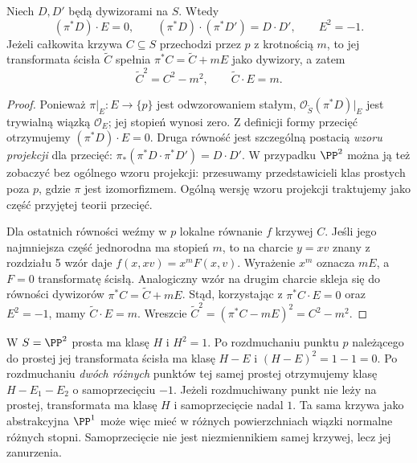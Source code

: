 \begin{stwierdzenie}
\label{st:ga6-blowup-form}
Niech $D,D'$ będą dywizorami na $S$. Wtedy
\[
 (\pi^*D)\cdot E=0,\qquad
 (\pi^*D)\cdot(\pi^*D')=D\cdot D',\qquad E^2=-1.
\]
Jeżeli całkowita krzywa $C\subseteq S$ przechodzi
przez $p$ z krotnością $m$, to jej transformata ścisła
$\widetilde C$ spełnia
$\pi^*C=\widetilde C+mE$ jako dywizory, a zatem
\[
 \widetilde C^2=C^2-m^2,\qquad
 \widetilde C\cdot E=m.
\]
\end{stwierdzenie}
\begin{proof}
Ponieważ $\pi|_E:E\to\{p\}$ jest odwzorowaniem stałym,
$\mathcal O_{\widetilde S}(\pi^*D)|_E$
jest trywialną wiązką $\mathcal O_E$;
jej stopień wynosi zero. Z definicji formy przecięć
otrzymujemy $(\pi^*D)\cdot E=0$.
Druga równość jest szczególną postacią \emph{wzoru projekcji}
dla przecięć: $\pi_*(\pi^*D\cdot\pi^*D')=D\cdot D'$.
W przypadku $\PP^2$ można ją też zobaczyć bez ogólnego
wzoru projekcji: przesuwamy przedstawicieli klas
prostych poza $p$, gdzie $\pi$ jest izomorfizmem.
Ogólną wersję wzoru projekcji traktujemy jako część
przyjętej teorii przecięć.

Dla ostatnich równości weźmy w $p$ lokalne równanie
$f$ krzywej $C$. Jeśli jego najmniejsza część
jednorodna ma stopień $m$, to na charcie $y=xv$
znany z rozdziału 5 wzór daje
$f(x,xv)=x^mF(x,v)$. Wyrażenie $x^m$ oznacza $mE$,
a $F=0$ transformatę ścisłą. Analogiczny wzór na drugim
charcie skleja się do równości dywizorów
$\pi^*C=\widetilde C+mE$. Stąd, korzystając z
$\pi^*C\cdot E=0$ oraz $E^2=-1$, mamy
$\widetilde C\cdot E=m$. Wreszcie
$\widetilde C^2=(\pi^*C-mE)^2=C^2-m^2$.
\end{proof}

\begin{przyklad}
\label{prz:ga6-blowup-curves}
W $S=\PP^2$ prosta ma klasę $H$ i $H^2=1$.
Po rozdmuchaniu punktu $p$ należącego do prostej
jej transformata ścisła ma klasę $H-E$ i
$(H-E)^2=1-1=0$. Po rozdmuchaniu \emph{dwóch różnych}
punktów tej samej prostej otrzymujemy klasę
$H-E_1-E_2$ o samoprzecięciu $-1$.
Jeżeli rozdmuchiwany punkt nie leży na prostej,
transformata ma klasę $H$ i samoprzecięcie nadal $1$.
Ta sama krzywa jako abstrakcyjna $\PP^1$ może więc
mieć w różnych powierzchniach wiązki normalne
różnych stopni. Samoprzecięcie nie jest niezmiennikiem
samej krzywej, lecz jej zanurzenia.
\end{przyklad}


